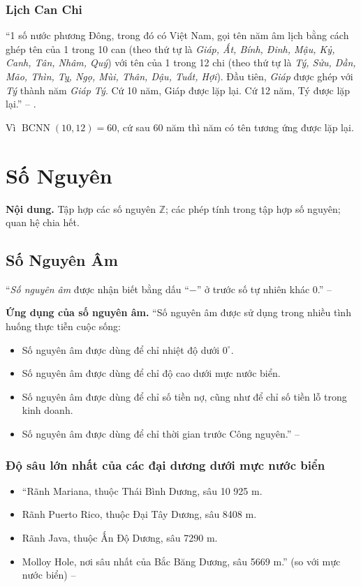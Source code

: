 \documentclass[oneside]{book}
\numberwithin{equation}{section}
\begin{document}
\subsection{Lịch Can Chi}
``1 số nước phương Đông, trong đó có Việt Nam, gọi tên năm âm lịch bằng cách ghép tên của 1 trong 10 can (theo thứ tự là \textit{Giáp, Ất, Bính, Đinh, Mậu, Kỷ, Canh, Tân, Nhâm, Quý}) với tên của 1 trong 12 chi (theo thứ tự là \textit{Tý, Sửu, Dần, Mão, Thìn, Tỵ, Ngọ, Mùi, Thân, Dậu, Tuất, Hợi}). Đầu tiên, \textit{Giáp} được ghép với \textit{Tý} thành năm \textit{Giáp Tý}. Cứ 10 năm, Giáp được lặp lại. Cứ 12 năm, Tý được lặp lại.'' -- \cite[p. 58]{Thai_Anh_Dat_Ha_Loan_Nam_Quang_Toan_6_tap_1}.

Vì $\operatorname{BCNN}(10,12) = 60$, cứ sau 60 năm thì năm có tên tương ứng được lặp lại.


\chapter{Số Nguyên}
\textbf{Nội dung.} Tập hợp các số nguyên $\mathbb{Z}$; các phép tính trong tập hợp số nguyên; quan hệ chia hết.

\section{Số Nguyên Âm}
``\emph{Số nguyên âm} được nhận biết bằng dấu ``$-$'' ở trước số tự nhiên khác 0.'' -- \cite[p. 61]{Thai_Anh_Dat_Ha_Loan_Nam_Quang_Toan_6_tap_1}

\noindent\textbf{Ứng dụng của số nguyên âm.} ``Số nguyên âm được sử dụng trong nhiều tình huống thực tiễn cuộc sống:
\begin{itemize}
	\item Số nguyên âm được dùng để chỉ nhiệt độ dưới $0^\circ$.
	\item Số nguyên âm được dùng để chỉ độ cao dưới mực nước biển.
	\item Số nguyên âm được dùng để chỉ số tiền nợ, cũng như để chỉ số tiền lỗ trong kinh doanh.
	\item Số nguyên âm được dùng để chỉ thời gian trước Công nguyên.'' -- \cite[p. 62]{Thai_Anh_Dat_Ha_Loan_Nam_Quang_Toan_6_tap_1}
\end{itemize}

\subsection{Độ sâu lớn nhất của các đại dương dưới mực nước biển}
\begin{itemize}
	\item ``Rãnh Mariana, thuộc Thái Bình Dương, sâu 10 925 m.
	\item Rãnh Puerto Rico, thuộc Đại Tây Dương, sâu 8408 m.
	\item Rãnh Java, thuộc Ấn Độ Dương, sâu 7290 m.
	\item Molloy Hole, nơi sâu nhất của Bắc Băng Dương, sâu 5669 m.'' (so với mực nước biển) -- \cite[p. 63]{Thai_Anh_Dat_Ha_Loan_Nam_Quang_Toan_6_tap_1}
\end{itemize}
\end{document}
